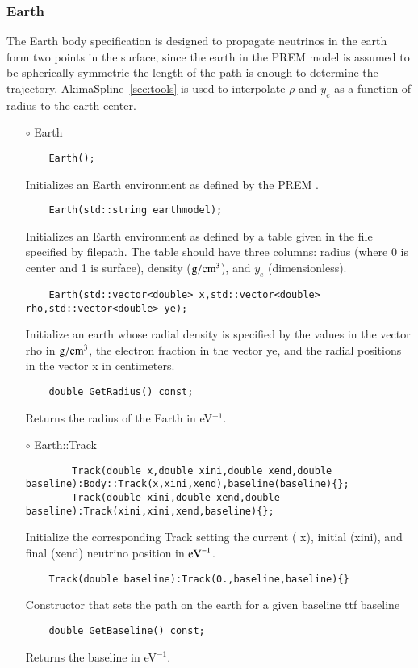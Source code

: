 \subsubsection{Earth}
The {\ttf Earth} body specification is designed to propagate neutrinos
in the earth form two points in the surface, since the earth in the
PREM model is assumed to be spherically symmetric the length of the
path is enough to determine the trajectory. {\ttfamily AkimaSpline}~\ref{sec:tools} is used to interpolate $\rho$ and $y_e$ as a function of radius to the earth center.
\begin{itemize}
\item[$\circ$] {\ttf Earth}
  \begin{lstlisting}
    Earth();
  \end{lstlisting}
  Initializes an {\ttf Earth} environment as defined by the PREM \citep{dziewonski1981preliminary}.
  \begin{lstlisting}
    Earth(std::string earthmodel);
  \end{lstlisting}
  Initializes an {\ttf Earth} environment as defined by a table given in the file specified by {\ttf filepath}. The table should have three columns: radius (where 0 is center and 1 is surface), density (${\rm g}/{\rm cm}^3$), and $y_e$ (dimensionless). 
  \begin{lstlisting}
    Earth(std::vector<double> x,std::vector<double> rho,std::vector<double> ye);
  \end{lstlisting}
  Initialize an {\ttf earth} whose radial density is specified by the
  values in the vector {\ttf rho} in ${\rm g}/{\rm cm}^3$, the
  electron fraction in the vector {\ttf ye}, and the radial positions
  in the vector {\ttf x} in centimeters. 

  \begin{lstlisting}
    double GetRadius() const;
  \end{lstlisting}
  Returns the radius of the Earth in eV$^{-1}$.

\item[$\circ$] {\ttf Earth::Track}
  \begin{lstlisting}
        Track(double x,double xini,double xend,double baseline):Body::Track(x,xini,xend),baseline(baseline){};
        Track(double xini,double xend,double baseline):Track(xini,xini,xend,baseline){};
  \end{lstlisting}
  Initialize the corresponding {\ttf Track} setting the current ({\ttf
    x}), initial ({\ttf xini}), and final ({\ttf xend}) neutrino position in ${\rm eV}^{-1}$.
  
  \begin{lstlisting}
    Track(double baseline):Track(0.,baseline,baseline){}
  \end{lstlisting}
  Constructor that sets the path on the earth for a given baseline
  {ttf baseline}

  \begin{lstlisting}
    double GetBaseline() const;
  \end{lstlisting}
  Returns the baseline in eV$^{-1}$.
    
\end{itemize}


